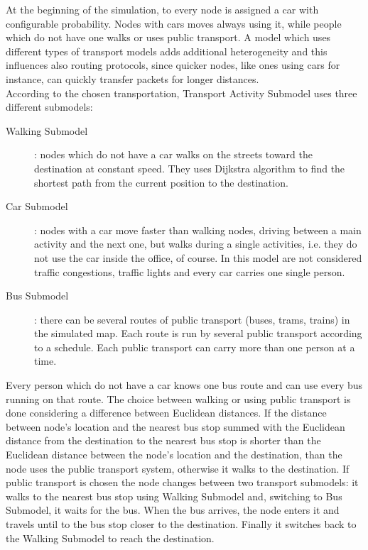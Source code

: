 At the beginning of the simulation, to every node is assigned a car with configurable probability. Nodes with cars moves always using it, while people which do not have one walks or uses public transport. A model which uses different types of transport models adds additional heterogeneity and this influences also routing protocols, since quicker nodes, like ones using cars for instance, can quickly transfer packets for longer distances.
\\

According to the chosen transportation, Transport Activity Submodel uses three different submodels:
\\

\begin{description}
\item [Walking Submodel]: nodes which do not have a car walks on the streets toward the destination at constant speed. They uses Dijkstra algorithm to find the shortest path from the current position to the destination.

\item [Car Submodel]: nodes with a car move faster than walking nodes, driving between a main activity and the next one, but walks during a single activities, i.e. they do not use the car inside the office, of course. In this model are not considered traffic congestions, traffic lights and every car carries one single person.

\item [Bus Submodel]: there can be several routes of public transport (buses, trams, trains) in the simulated map. Each route is run by several public transport according to a schedule. Each public transport can carry more than one person at a time.
\end{description}

Every person which do not have a car knows one bus route and can use every bus running on that route. The choice between walking or using public transport is done considering a difference between Euclidean distances. If the distance between node's location and the nearest bus stop summed with the Euclidean distance from the destination to the nearest bus stop is shorter than the Euclidean distance between the node's location and the destination, than the node uses the public transport system, otherwise it walks to the destination. If public transport is chosen the node changes between two transport submodels: it walks to the nearest bus stop using Walking Submodel and, switching to Bus Submodel, it waits for the bus. When the bus arrives, the node enters it and travels until to the bus stop closer to the destination. Finally it switches back to the Walking Submodel to reach the destination.
 
